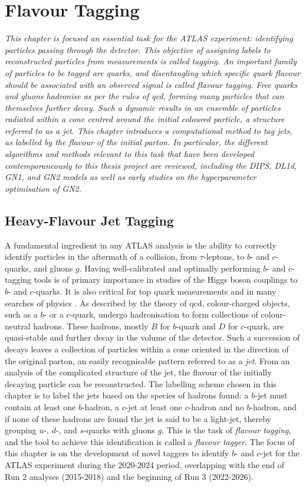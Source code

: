 \chapter{\color{oxfordblue} Flavour Tagging}\label{chap-ftag}
\ChapFrame

\textit{
This chapter is focused an essential task for the ATLAS experiment: identifying particles passing through the detector. This objective of assigning labels to reconstructed particles from measurements is called tagging. An important family of particles to be tagged are quarks, and disentangling which specific quark flavour should be associated with an observed signal is called flavour tagging. Free quarks and gluons hadronise as per the rules of \gls{qcd}, forming many particles that can themselves further decay. Such a dynamic results in an ensemble of particles radiated within a cone centred around the initial coloured particle, a structure referred to as a jet. This chapter introduces a computational method to tag jets, as labelled by the flavour of the initial parton. In particular, the different algorithms and methods relevant to this task that have been developed contemporaneously to this thesis project are reviewed, including the DIPS, DL1d, GN1, and GN2 models as well as early studies on the hyperparameter optimisation of GN2.
}

\section{Heavy-Flavour Jet Tagging}
A fundamental ingredient in any ATLAS analysis is the ability to correctly identify particles in the aftermath of a collision, from $\tau$-leptons, to $b$- and $c$-quarks, and gluons $g$. Having well-calibrated and optimally performing $b$- and $c$-tagging tools is of primary importance in studies of the Higgs boson couplings to $b$- and $c$-quarks. It is also critical for top quark measurements and in many searches of physics . As described by the theory of \gls{qcd}, colour-charged objects, such as a $b$- or a $c$-quark, undergo hadronisation to form collections of colour-neutral hadrons. These hadrons, mostly $B$ for $b$-quark and $D$ for $c$-quark, are quasi-stable and further decay in the volume of the detector. Such a succession of decays leaves a collection of particles within a cone oriented in the direction of the original parton, an easily recognisable pattern referred to as a \textit{jet}. From an analysis of the complicated structure of the jet, the flavour of the initially decaying particle can be reconstructed. The labelling scheme chosen in this chapter is to label the jets based on the species of hadrons found: a $b$-jet must contain at least one $b$-hadron, a $c$-jet at least one $c$-hadron and no $b$-hadron, and if none of these hadrons are found the jet is said to be a light-jet, thereby grouping $u$-, $d$-, and $s$-quarks with gluons $g$. This is the task of \textit{flavour tagging}, and the tool to achieve this identification is called a \textit{flavour tagger}. The focus of this chapter is on the development of novel taggers to identify $b$- and $c$-jet for the ATLAS experiment during the 2020-2024 period, overlapping with the end of Run 2 analyses (2015-2018) and the beginning of Run 3 (2022-2026). 

